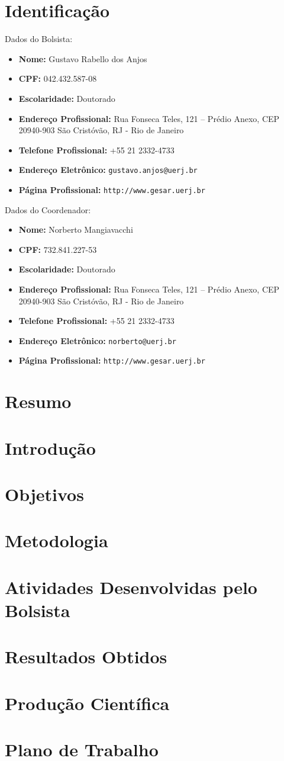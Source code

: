 \documentclass[a4paper,portuges]{article}
\begin{document}
	


\section{Identificação}

Dados do Bolsista: 
\begin{itemize}
	\item \textbf{Nome:} Gustavo Rabello dos Anjos
	\item \textbf{CPF:} 042.432.587-08
	\item \textbf{Escolaridade:} Doutorado
	\item \textbf{Endereço Profissional:} Rua Fonseca Teles, 121 --
	Prédio Anexo, CEP 20940-903 São Cristóvão, RJ - Rio de Janeiro
	\item \textbf{Telefone Profissional:} +55 21 2332-4733
	\item \textbf{Endereço Eletrônico:} {\tt gustavo.anjos@uerj.br}
	\item \textbf{Página Profissional:} {\tt http://www.gesar.uerj.br}
\end{itemize}

\noindent Dados do Coordenador: 
\begin{itemize}
	\item \textbf{Nome:} Norberto Mangiavacchi
	\item \textbf{CPF:} 732.841.227-53
	\item \textbf{Escolaridade:} Doutorado
	\item \textbf{Endereço Profissional:} Rua Fonseca Teles, 121 --
	Prédio Anexo, CEP 20940-903 São Cristóvão, RJ - Rio de Janeiro
	\item \textbf{Telefone Profissional:} +55 21 2332-4733
	\item \textbf{Endereço Eletrônico:} {\tt norberto@uerj.br}
	\item \textbf{Página Profissional:} {\tt http://www.gesar.uerj.br}
\end{itemize}

\section{Resumo}
\section{Introdução}
\section{Objetivos}
\section{Metodologia}
\section{Atividades Desenvolvidas pelo Bolsista}
\section{Resultados Obtidos}
\section{Produção Científica}
\section{Plano de Trabalho}
\end{document}
